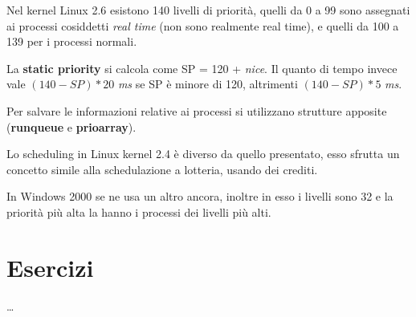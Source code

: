 Nel kernel Linux 2.6 esistono 140 livelli di priorità, quelli da 0 a 99 sono assegnati ai processi cosiddetti \textit{real time} (non sono realmente real time), e quelli da 100 a 139 per i processi normali.

La \textbf{static priority} si calcola come SP = 120 + \textit{nice}.
Il quanto di tempo invece vale $(140-SP)*20$ \textit{ms} se SP è minore di 120, altrimenti $(140-SP)*5$ \textit{ms}.

Per salvare le informazioni relative ai processi si utilizzano strutture apposite (\textbf{runqueue} e \textbf{prioarray}).


Lo scheduling in Linux kernel 2.4 è diverso da quello presentato, esso sfrutta un concetto simile alla schedulazione a lotteria, usando dei crediti.


In Windows 2000 se ne usa un altro ancora, inoltre in esso i livelli sono 32 e la priorità più alta la hanno i processi dei livelli più alti.

\section{Esercizi}

\dots